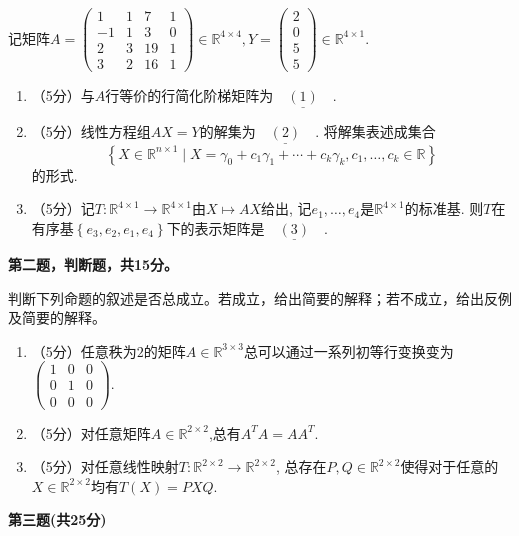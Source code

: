     记矩阵$A=\begin{pmatrix}1&1&7&1\\-1&1&3&0\\2&3&19&1\\3&2&16&1\end{pmatrix}\in\mathbb{R}^{4\times 4},Y=\begin{pmatrix}2\\0\\5\\5\end{pmatrix}\in\mathbb{R}^{4\times1}$.
    \begin{enumerate}
    \item（5分）与$A$行等价的行简化阶梯矩阵为$\underline{\quad(1)\quad}$.
    \item（5分）线性方程组$AX=Y$的解集为$\underline{\quad(2)\quad}$. 将解集表述成集合
    $$\left\{ X\in\mathbb{R}^{n\times 1}\mid X=\gamma_0+c_1\gamma_1+\cdots+c_k\gamma_k,c_1,\ldots,c_k\in\mathbb{R} \right\}$$
    的形式.
    \item（5分）记$T:\mathbb{R}^{4\times1}\rightarrow\mathbb{R}^{4\times1}$由$X\mapsto AX$给出,
    记$e_1,\ldots,e_4$是$\mathbb{R}^{4\times1}$的标准基.
    则$T$在有序基$\left\{ e_3,e_2,e_1,e_4 \right\}$下的表示矩阵是$\underline{\quad(3)\quad}$.
    \end{enumerate}
    \textbf{第二题，判断题，共15分。}
    
    判断下列命题的叙述是否总成立。若成立，给出简要的解释；若不成立，给出反例及简要的解释。
    \begin{enumerate}
    \item（5分）任意秩为$2$的矩阵$A\in\mathbb{R}^{3\times3}$总可以通过一系列初等行变换变为
    $\begin{pmatrix}1&0&0\\0&1&0\\0&0&0\end{pmatrix}$.
    \item（5分）对任意矩阵$A\in\mathbb{R}^{2\times 2}$,总有$A^TA=AA^T$.
    \item（5分）对任意线性映射$T:\mathbb{R}^{2\times 2}\rightarrow\mathbb{R}^{2\times 2}$,
    总存在$P,Q\in\mathbb{R}^{2\times 2}$使得对于任意的$X\in\mathbb{R}^{2\times 2}$均有$T(X)=PXQ$.
    \end{enumerate}
    \textbf{第三题(共25分)}
    
